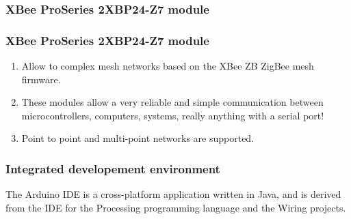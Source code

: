 \documentclass{beamer}
\begin{document}
\frame
{
	\frametitle{XBee ProSeries 2XBP24-Z7 module}
	\begin{figure}	
	\end{figure}	
}

\frame
{
	\frametitle{XBee ProSeries 2XBP24-Z7 module}
	\begin{enumerate}
	\item Allow to complex mesh networks based on the XBee ZB ZigBee mesh firmware. 
	\item These modules allow a very reliable and simple communication between microcontrollers, computers, systems, really anything with a serial port! 
	\item Point to point and multi-point networks are supported.
	\end{enumerate}		
}

\frame
{
	\frametitle{Integrated developement environment}
	The Arduino IDE is a cross-platform application written in Java, and is derived from the IDE for the Processing programming language and the Wiring projects. 
}
\end{document}
